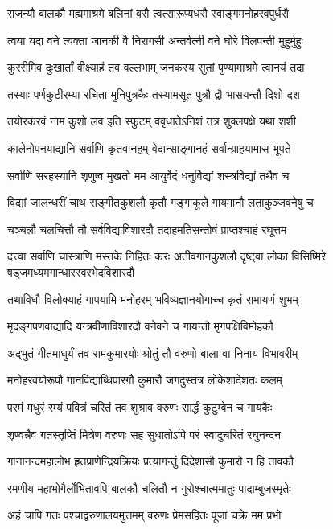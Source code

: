 \twolineshloka
{राजन्यौ बालकौ मह्यमाश्रमे बलिनां वरौ}
{त्वत्सारूप्यधरौ स्वाङ्गमनोहरवपुर्धरौ}%

\twolineshloka
{त्वया यदा वने त्यक्ता जानकी वै निरागसी}
{अन्तर्वत्नी वने घोरे विलपन्ती मुहुर्मुहुः}%

\twolineshloka
{कुररीमिव दुःखार्तां वीक्ष्याहं तव वल्लभाम्}
{जनकस्य सुतां पुण्यामाश्रमे त्वानयं तदा}%

\twolineshloka
{तस्याः पर्णकुटीरम्या रचिता मुनिपुत्रकैः}
{तस्यामसूत पुत्रौ द्वौ भासयन्तौ दिशो दश}%

\twolineshloka
{तयोरकरवं नाम कुशो लव इति स्फुटम्}
{ववृधातेऽनिशं तत्र शुक्लपक्षे यथा शशी}%

\twolineshloka
{कालेनोपनयाद्यानि सर्वाणि कृतवानहम्}
{वेदान्साङ्गानहं सर्वान्ग्राहयामास भूपते}%

\twolineshloka
{सर्वाणि सरहस्यानि शृणुष्व मुखतो मम}
{आयुर्वेदं धनुर्विद्यां शस्त्रविद्यां तथैव च}%

\twolineshloka
{विद्यां जालन्धरीं चाथ सङ्गीतकुशलौ कृतौ}
{गङ्गाकूले गायमानौ लताकुञ्जवनेषु च}%

\twolineshloka
{चञ्चलौ चलचित्तौ तौ सर्वविद्याविशारदौ}
{तदाहमतिसन्तोषं प्राप्तश्चाहं रघूत्तम}%


\threelineshloka
{दत्त्वा सर्वाणि चास्त्राणि मस्तके निहितः करः}
{अतीवगानकुशलौ दृष्ट्वा लोका विसिष्मिरे}
{षड्जमध्यमगान्धारस्वरभेदविशारदौ}%

\twolineshloka
{तथाविधौ विलोक्याहं गापयामि मनोहरम्}
{भविष्यज्ञानयोगाच्च कृतं रामायणं शुभम्}%

\twolineshloka
{मृदङ्गपणवाद्यादि यन्त्रवीणाविशारदौ}
{वनेवने च गायन्तौ मृगपक्षिविमोहकौ}%

\twolineshloka
{अद्भुतं गीतमाधुर्यं तव रामकुमारयोः}
{श्रोतुं तौ वरुणो बाला वा निनाय विभावरीम्}%

\twolineshloka
{मनोहरवयोरूपौ गानविद्याब्धिपारगौ}
{कुमारौ जगदुस्तत्र लोकेशादेशतः कलम्}%

\twolineshloka
{परमं मधुरं रम्यं पवित्रं चरितं तव}
{शुश्राव वरुणः सार्द्धं कुटुम्बेन च गायकैः}%

\twolineshloka
{शृण्वन्नैव गतस्तृप्तिं मित्रेण वरुणः सह}
{सुधातोऽपि परं स्वादुचरितं रघुनन्दन}%

\twolineshloka
{गानानन्दमहालोभ हृतप्राणेन्द्रियक्रियः}
{प्रत्यागन्तुं दिदेशासौ कुमारौ न हि तावकौ}%

\twolineshloka
{रमणीय महाभोगैर्लोभितावपि बालकौ}
{चलितौ न गुरोश्चात्ममातुः पादाम्बुजस्मृतेः}%

\twolineshloka
{अहं चापि गतः पश्चाद्वरुणालयमुत्तमम्}
{वरुणः प्रेमसहितः पूजां चक्रे मम प्रभो}%

